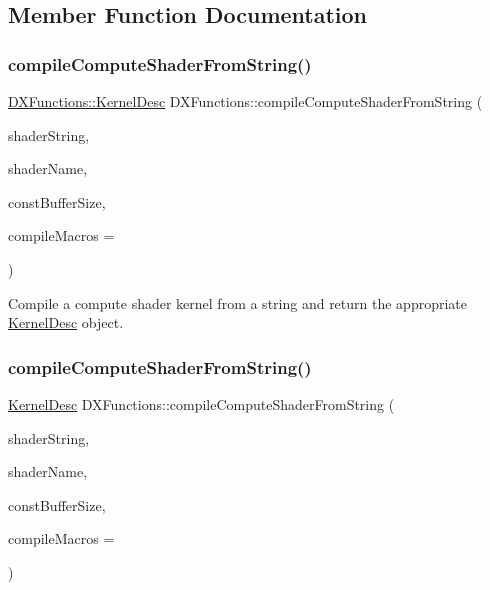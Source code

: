 \subsection{Member Function Documentation}
\mbox{\label{classDXFunctions_a0e3bb1fe5f14fe6d31c91543242e9308}} 
\subsubsection{\texorpdfstring{compile\+Compute\+Shader\+From\+String()}{compileComputeShaderFromString()}\hspace{0.1cm}{\footnotesize\ttfamily [1/2]}}
{\footnotesize\ttfamily \hyperlink{classDXFunctions_1_1KernelDesc}{D\+X\+Functions\+::\+Kernel\+Desc} D\+X\+Functions\+::compile\+Compute\+Shader\+From\+String (\begin{DoxyParamCaption}\item[{const char $\ast$}]{shader\+String,  }\item[{const char $\ast$}]{shader\+Name,  }\item[{int}]{const\+Buffer\+Size,  }\item[{D3\+D10\+\_\+\+S\+H\+A\+D\+E\+R\+\_\+\+M\+A\+C\+RO $\ast$}]{compile\+Macros = {} }\end{DoxyParamCaption})}

Compile a compute shader kernel from a string and return the appropriate \hyperlink{classDXFunctions_1_1KernelDesc}{Kernel\+Desc} object. \mbox{\label{classDXFunctions_a6375c595298f83e37ead99d33ffe0876}} 
\subsubsection{\texorpdfstring{compile\+Compute\+Shader\+From\+String()}{compileComputeShaderFromString()}\hspace{0.1cm}{\footnotesize\ttfamily [2/2]}}
{\footnotesize\ttfamily \hyperlink{classDXFunctions_1_1KernelDesc}{Kernel\+Desc} D\+X\+Functions\+::compile\+Compute\+Shader\+From\+String (\begin{DoxyParamCaption}\item[{const char $\ast$}]{shader\+String,  }\item[{const char $\ast$}]{shader\+Name,  }\item[{int}]{const\+Buffer\+Size,  }\item[{D3\+D10\+\_\+\+S\+H\+A\+D\+E\+R\+\_\+\+M\+A\+C\+RO $\ast$}]{compile\+Macros = {} }\end{DoxyParamCaption})}

